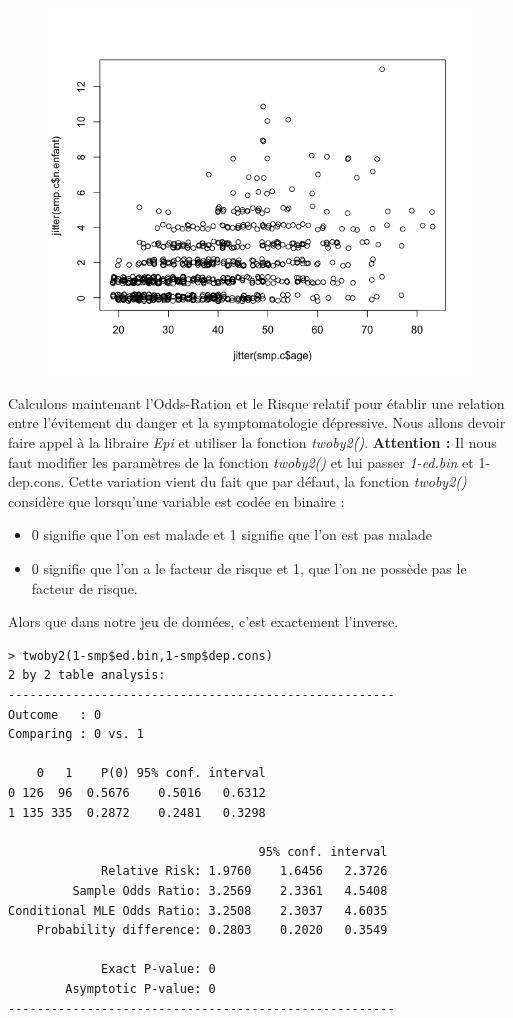 \begin{figure}[H]\begin{center}\includegraphics[scale=0.5]{ilu/bx.png}\end{center}\end{figure}
Calculons maintenant l'Odds-Ration et le Risque relatif pour établir une relation entre l'évitement du danger et la symptomatologie dépressive. Nous allons devoir faire appel à la libraire \textit{Epi} et utiliser la fonction \textit{twoby2()}.\newline
\textbf{Attention : } Il nous faut modifier les paramètres de la fonction \textit{twoby2()} et lui passer \textit{1-ed.bin} et {1-dep.cons}. Cette variation vient du fait que par défaut, la fonction \textit{twoby2()} considère que lorsqu'une variable est codée en binaire :
\begin{itemize}
\item 0 signifie que l'on est malade et 1 signifie que l'on est pas malade
\item 0 signifie que l'on a le facteur de risque et 1, que l'on ne possède pas le facteur de risque. 
\end{itemize} 
Alors que dans notre jeu de données, c'est exactement l'inverse.
\begin{lstlisting}[language=html]
> twoby2(1-smp$ed.bin,1-smp$dep.cons)
2 by 2 table analysis: 
------------------------------------------------------ 
Outcome   : 0 
Comparing : 0 vs. 1 

    0   1    P(0) 95% conf. interval
0 126  96  0.5676    0.5016   0.6312
1 135 335  0.2872    0.2481   0.3298

                                   95% conf. interval
             Relative Risk: 1.9760    1.6456   2.3726
         Sample Odds Ratio: 3.2569    2.3361   4.5408
Conditional MLE Odds Ratio: 3.2508    2.3037   4.6035
    Probability difference: 0.2803    0.2020   0.3549

             Exact P-value: 0 
        Asymptotic P-value: 0 
------------------------------------------------------
\end{lstlisting}
